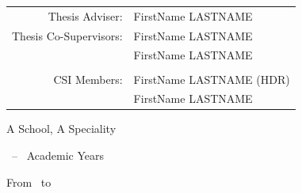 \begin{titlepage}
\begin{minipage}[t][0.12\headerheight]{\linewidth}
\end{minipage}

\begin{minipage}[t][0.23\headerheight]{\linewidth}
    \normalsize
    \centering

    \begin{tabular}{rl}
        Thesis Adviser: & FirstName LASTNAME \\
        Thesis Co-Supervisors: & FirstName LASTNAME \\
        & FirstName LASTNAME \\
        & \\
        CSI Members: & FirstName LASTNAME (HDR) \\
        & FirstName LASTNAME
    \end{tabular}

\end{minipage}

\begin{minipage}[b][0.07\headerheight]{\linewidth}
    \normalsize
    \centering

    A School, A Speciality
    
    \StartYear~-- \EndYear~Academic Years
    
    From \StartDate~to \EndDate

\end{minipage}

\end{titlepage}

\restoregeometry